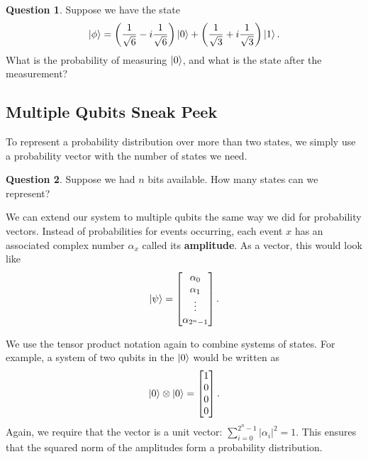 \documentclass[letterpaper, 12pt]{article}
\newcommand{\1}{\mathds{1}}	%
\theoremstyle{definition}
\newtheorem{question}{Question}
\begin{document}
\begin{question}
    Suppose we have the state 
    \begin{equation}
        \ket{\phi} = \left( \frac{1}{\sqrt{6}} - i \frac{1}{\sqrt{6}} \right)\ket{0} + \left( \frac{1}{\sqrt{3}} + i \frac{1}{\sqrt{3}}\right)\ket{1}.
    \end{equation}
    What is the probability of measuring $\ket{0}$, and what is the state after the measurement?
\end{question}

\newpage 

\subsection{Multiple Qubits Sneak Peek}

To represent a probability distribution over more than two states, we simply use a probability vector with the number of states we need. 

\begin{question}
Suppose we had $n$ bits available. How many states can we represent? 
\end{question}
\vspace{15mm}


We can extend our system to multiple qubits the same way we did for probability vectors. Instead of probabilities for events occurring, each event $x$ has an associated complex number $\alpha_x$ called its \textbf{amplitude}. As a vector, this would look like
\begin{equation}
    \ket{\psi} = \begin{bmatrix}
        \alpha_0 \\ \alpha_1 \\ \vdots \\ \alpha_{2^n - 1}
    \end{bmatrix}.
\end{equation}

We use the tensor product notation again to combine systems of states. For example, a system of two qubits in the $\ket{0}$ would be written as 
\begin{equation}
    \ket{0} \otimes \ket{0} = \begin{bmatrix}
        1\\0\\0\\0
    \end{bmatrix}.
\end{equation}
Again, we require that the vector is a unit vector: $\sum_{i=0}^{2^n - 1} |\alpha_i|^2 = 1$. This ensures that the squared norm of the amplitudes form a probability distribution. 
\end{document}

